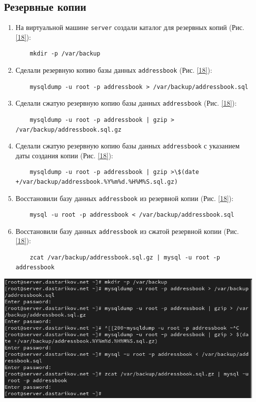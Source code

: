 \subsection{Резервные копии}
\begin{enumerate}
\item На виртуальной машине \texttt{server} создали каталог для резервных копий (Рис. \ref{18}):
  \begin{verbatim}
    mkdir -p /var/backup
  \end{verbatim}
\item Сделали резервную копию базы данных \texttt{addressbook} (Рис. \ref{18}):
  \begin{verbatim}
    mysqldump -u root -p addressbook > /var/backup/addressbook.sql
  \end{verbatim}
\item Сделали сжатую резервную копию базы данных \texttt{addressbook} (Рис. \ref{18}):
  \begin{verbatim}
    mysqldump -u root -p addressbook | gzip > /var/backup/addressbook.sql.gz
  \end{verbatim}
\item Сделали сжатую резервную копию базы данных \texttt{addressbook} с указанием даты создания копии (Рис. \ref{18}):
  \begin{verbatim}
    mysqldump -u root -p addressbook | gzip >\$(date +/var/backup/addressbook.%Y%m%d.%H%M%S.sql.gz)
  \end{verbatim}
\item Восстановили базу данных \texttt{addressbook} из резервной копии (Рис. \ref{18}):
  \begin{verbatim}
    mysql -u root -p addressbook < /var/backup/addressbook.sql
  \end{verbatim}
\item Восстановили базу данных \texttt{addressbook} из сжатой резервной копии (Рис. \ref{18}):
  \begin{verbatim}
    zcat /var/backup/addressbook.sql.gz | mysql -u root -p addressbook
  \end{verbatim}
\end{enumerate}

\begin{center}
    \centering
    \includegraphics[width=\textwidth]{../images/image18.png}
    \label{18}
\end{center}


